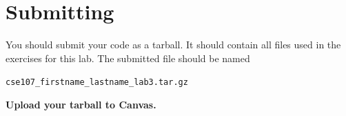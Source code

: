 \documentclass[11pt]{cselabheader}
\begin{document}
\pagebreak
\section{Submitting}

You should submit your code as a tarball. It should contain all files
used in the exercises for this lab. The submitted file should be named
\begin{center}
  \texttt{cse107\_firstname\_lastname\_lab3.tar.gz}
\end{center}

\begin{center}
  \textbf{Upload your tarball to Canvas.}
\end{center}

\listoftheorems
\end{document}
